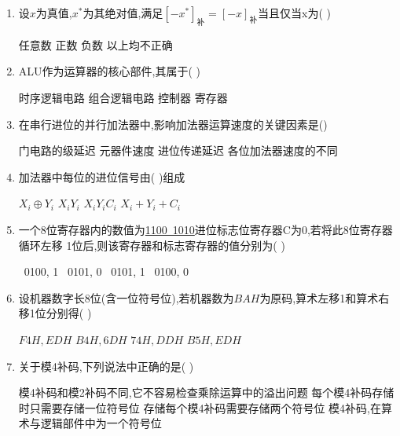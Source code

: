 \documentclass[12pt, a4paper, oneside, UTF8]{ctexbook}
\begin{document}
\begin{enumerate}
    \item 设$x$为真值,$x^{*}$为其绝对值,满足$[-x^*]_{\text{补}}=[-x]_{\text{补}}$当且仅当x为(   ) 
    \begin{choices}
        \task 任意数
        \task 正数 
        \task 负数 
        \task 以上均不正确
    \end{choices}
    

    \item ALU作为运算器的核心部件,其属于(   ) 
    \begin{choices}
        \task 时序逻辑电路
        \task 组合逻辑电路
        \task 控制器 
        \task 寄存器
    \end{choices}
    
    \item 在串行进位的并行加法器中,影响加法器运算速度的关键因素是() 
    \begin{choices}[2]
        \task 门电路的级延迟 
        \task 元器件速度 
        \task 进位传递延迟 
        \task 各位加法器速度的不同
    \end{choices}

    \item 加法器中每位的进位信号由(   )组成
    \begin{choices}
        \task $X_i\oplus Y_i$
        \task $X_iY_i$
        \task $X_iY_iC_i$
        \task $X_i+Y_i+C_i$
    \end{choices}
    

    \item 一个8位寄存器内的数值为\underline{1100\ 1010}进位标志位寄存器C为0,若将此8位寄存器循环左移
    1位后,则该寄存器和标志寄存器的值分别为(   ) 
    \begin{choices}
        \ 0100, 1
        \ 0101, 0
        \ 0101, 1
        \ 0100, 0
    \end{choices}
    

    \item 设机器数字长8位(含一位符号位),若机器数为$BAH$为原码,算术左移1和算术右移1位分别得(   ) 
    \begin{choices}
        \task $F4H,EDH$
        \task $B4H,6DH$
        \task $74H,DDH$
        \task $B5H,EDH$
    \end{choices}
    

    \item 关于模4补码,下列说法中正确的是(   ) 
    \begin{choices}[1]
        \task 模4补码和模2补码不同,它不容易检查乘除运算中的溢出问题
        \task 每个模4补码存储时只需要存储一位符号位
        \task 存储每个模4补码需要存储两个符号位
        \task 模4补码,在算术与逻辑部件中为一个符号位
    \end{choices}



\end{enumerate}
\end{document}
